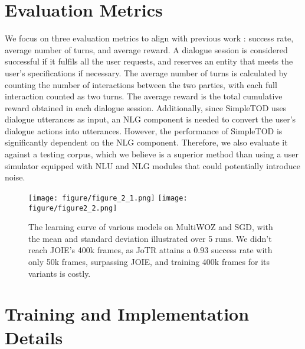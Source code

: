 \documentclass[letterpaper]{article} %
\begin{document}
\section{Evaluation Metrics}
\label{sec:appendix_simulator}
We focus on three evaluation metrics to align with previous work \cite{wang-wong-2021-collaborative}: success rate, average number of turns, and average reward. A dialogue session is considered successful if it fulfils all the user requests, and reserves an entity that meets the user's specifications if necessary. 
The average number of turns is calculated by counting the number of interactions between the two parties, with each full interaction counted as two turns. 
The average reward is the total cumulative reward obtained in each dialogue session. 
Additionally, since SimpleTOD uses dialogue utterances as input, an NLG component is needed to convert the user's dialogue actions into utterances. However, the performance of SimpleTOD is significantly dependent on the NLG component. Therefore, we also evaluate it against a testing corpus, which we believe is a superior method than using a user simulator equipped with NLU and NLG modules that could potentially introduce noise.

\begin{figure*}
\small
\centering
\texttt{[image: figure/figure\_2\_1.png]}
\centering
\texttt{[image: figure/figure2\_2.png]}
\caption{The learning curve of various models on MultiWOZ and SGD, with the mean and standard deviation illustrated over 5 runs. We didn't reach JOIE's 400k frames, as JoTR attains a 0.93 success rate with only 50k frames, surpassing JOIE, and training 400k frames for its variants is costly.}
\label{fig:learning_curve}
\vspace{-3mm}
\end{figure*}

\section{Training and Implementation Details}
\label{sec:implementation}

\end{document}
